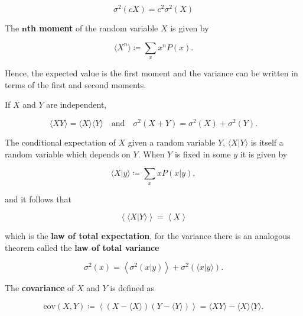 \begin{equation}
  \label{eq:con-var_const}
  \sigma^2(cX) = c^2\sigma^2(X)
\end{equation}

The $\mathbf{n}$\textbf{th moment} of the random variable $X$ is given by

\begin{equation*}
  \langle X^n\rangle \coloneqq \sum_xx^nP(x).
\end{equation*}

Hence, the expected value is the first moment and the variance can be written in terms of the first and second moments.

If $X$ and $Y$ are independent,

\begin{equation}
  \label {eq:con-mom_ind}
  \langle XY\rangle = \langle X\rangle\langle Y\rangle \quad\text{and}\quad \sigma^2(X+Y) = \sigma^2(X)+\sigma^2(Y).
\end{equation}

The conditional expectation of $X$ given a random variable $Y$, $\langle X|Y\rangle$ is itself a random variable which depends on $Y$. When $Y$ is fixed in some $y$ it is given by

\begin{equation*}
  \langle X|y\rangle \coloneqq \sum_xxP(x|y),
\end{equation*}

and it follows that

\begin{equation}
  \label{eq:con-total_exp}
  \left\langle\langle X|Y\rangle\right\rangle = \left\langle X\right\rangle
\end{equation}

which is the \textbf{law of total expectation}, for the variance there is an analogous theorem called the \textbf{law of total variance}

\begin{equation}
  \label{eq:con-total_var}
  \sigma^2(x) = \left\langle\sigma^2(x|y)\right\rangle + \sigma^2\left(\langle x|y\rangle\right).
\end{equation}

The \textbf{covariance} of $X$ and $Y$ is defined as

\begin{equation*}
  \text{cov}(X,Y) \coloneqq \left\langle\left(X-\langle X\rangle\right)\left(Y-\langle Y\rangle\right)\right\rangle = \langle XY\rangle - \langle X\rangle\langle Y\rangle.
\end{equation*}

